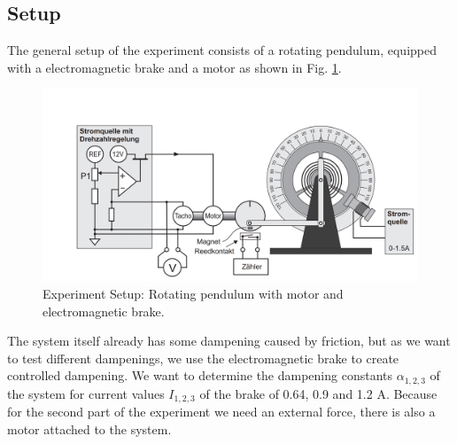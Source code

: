 \subsection{Setup}
The general setup of the experiment consists of a rotating pendulum, equipped with a electromagnetic brake and a motor as shown in Fig. \ref{fig::setup}.
\begin{figure} [ht]
	\centering
	\includegraphics[width=400pt]{img/setup.PNG}
	\caption{Experiment Setup: Rotating pendulum with motor and electromagnetic brake. \cite{manual}}
	\label{fig::setup}
\end{figure}

The system itself already has some dampening caused by friction, but as we want to test different dampenings, we use the electromagnetic brake to create controlled dampening.
We want to determine the dampening constants $\alpha_{1, 2, 3}$ of the system for current values $I_{1, 2, 3}$ of the brake of 0.64, 0.9 and 1.2 A.
Because for the second part of the experiment we need an external force, there is also a motor attached to the system.